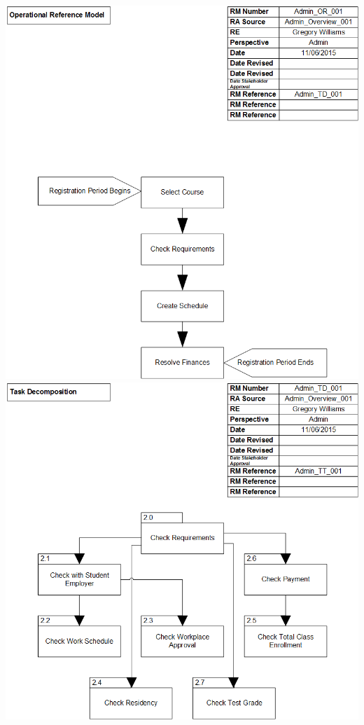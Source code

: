 \documentclass{article}
\begin{document}
	\includegraphics[width=\textwidth]{OperationalReferenceModel}
	\\
	\includegraphics[width=\textwidth]{TaskDecomposition2}
\end{document}
